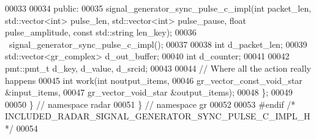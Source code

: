 \begin{DoxyCode}
00033 
00034      \textcolor{keyword}{public}:
00035       signal_generator_sync_pulse_c_impl(\textcolor{keywordtype}{int} packet\_len, std::vector<int> pulse\_len, std::vector<int> 
      pulse\_pause, \textcolor{keywordtype}{float} pulse\_amplitude, \textcolor{keyword}{const} std::string len\_key);
00036       ~signal_generator_sync_pulse_c_impl();
00037       
00038       \textcolor{keywordtype}{int} d_packet_len;
00039       std::vector<gr\_complex> d_out_buffer;
00040       \textcolor{keywordtype}{int} d_counter;
00041       
00042       pmt::pmt\_t d_key, d_value, d_srcid;
00043 
00044       \textcolor{comment}{// Where all the action really happens}
00045       \textcolor{keywordtype}{int} work(\textcolor{keywordtype}{int} noutput\_items,
00046            gr\_vector\_const\_void\_star &input\_items,
00047            gr\_vector\_void\_star &output\_items);
00048     \};
00049 
00050   \} \textcolor{comment}{// namespace radar}
00051 \} \textcolor{comment}{// namespace gr}
00052 
00053 \textcolor{preprocessor}{#endif }\textcolor{comment}{/* INCLUDED\_RADAR\_SIGNAL\_GENERATOR\_SYNC\_PULSE\_C\_IMPL\_H */}\textcolor{preprocessor}{}
00054 
\end{DoxyCode}
